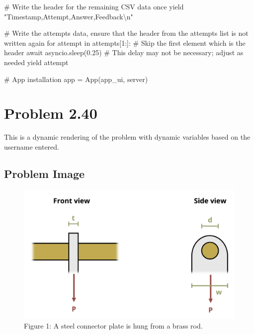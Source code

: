 \documentclass[
  letterpaper,
  DIV=11,
  numbers=noendperiod]{scrreprt}
\newenvironment{Shaded}{\begin{snugshade}}{\end{snugshade}}
\newcommand{\NormalTok}[1]{\textcolor[rgb]{0.00,0.23,0.31}{#1}}
\begin{document}
\begin{Shaded}
\begin{Highlighting}[]
\NormalTok{        \# Write the header for the remaining CSV data once}
\NormalTok{        yield "Timestamp,Attempt,Answer,Feedback\textbackslash{}n"}
        
\NormalTok{        \# Write the attempts data, ensure that the header from the attempts list is not written again}
\NormalTok{        for attempt in attempts[1:]:  \# Skip the first element which is the header}
\NormalTok{            await asyncio.sleep(0.25)  \# This delay may not be necessary; adjust as needed}
\NormalTok{            yield attempt}


\NormalTok{\# App installation}
\NormalTok{app = App(app\_ui, server)}
\end{Highlighting}
\end{Shaded}

\chapter*{Problem 2.40}\label{problem-2.40}


This is a dynamic rendering of the problem with dynamic variables based
on the username entered.

\section*{Problem Image}\label{problem-image-29}


\begin{figure}[H]

{\centering \includegraphics{images/169.png}

}

\caption{Figure 1: A steel connector plate is hung from a brass rod.}

\end{figure}%
\end{document}
